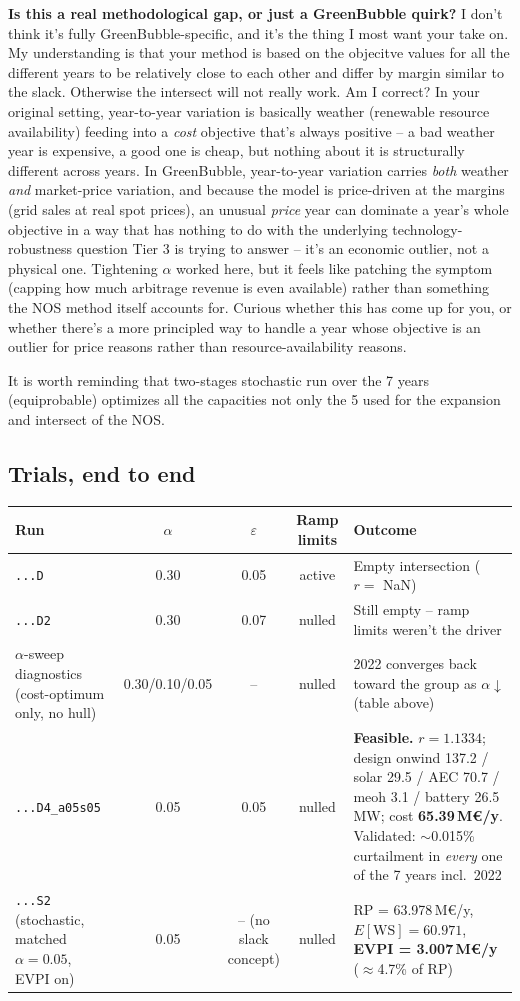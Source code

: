 \documentclass[11pt]{article}
\begin{document}
\textbf{Is this a real methodological gap, or just a GreenBubble
quirk?} I don't think it's fully GreenBubble-specific, and it's the thing
I most want your take on. My understanding is that your method is based on
the objecitve values for all the different years to be relatively close to
each other and differ by margin similar to the slack. Otherwise the intersect
will not really work. Am I correct? In your original setting, year-to-year
variation is basically weather (renewable resource availability) feeding into a
\emph{cost} objective that's always positive -- a bad weather year is
expensive, a good one is cheap, but nothing about it is structurally
different across years. In GreenBubble, year-to-year variation carries
\emph{both} weather \emph{and} market-price variation, and because the
model is price-driven at the margins (grid sales at real spot prices), an
unusual \emph{price} year can dominate a year's whole objective in a way
that has nothing to do with the underlying technology-robustness question
Tier 3 is trying to answer -- it's an economic outlier, not a physical one.
Tightening $\alpha$ worked here, but it feels like patching the symptom
(capping how much arbitrage revenue is even available) rather than
something the NOS method itself accounts for. Curious whether this has
come up for you, or whether there's a more principled way to handle a year
whose objective is an outlier for price reasons rather than
resource-availability reasons.

It is worth reminding that two-stages stochastic run over the 7 years (equiprobable)
optimizes all the capacities not only the 5 used for the expansion and intersect of the NOS.

\subsection{Trials, end to end}
\begin{center}
\small
\begin{tabular}{@{}p{2.9cm}cccp{6.4cm}@{}}
\toprule
\textbf{Run} & $\alpha$ & $\varepsilon$ & Ramp limits & \textbf{Outcome} \\
\midrule
\texttt{...D} & 0.30 & 0.05 & active &
Empty intersection ($r=$ NaN) \\
\texttt{...D2} & 0.30 & 0.07 & nulled &
Still empty -- ramp limits weren't the driver \\
$\alpha$-sweep diagnostics (cost-optimum only, no hull) & 0.30/0.10/0.05 & -- & nulled &
2022 converges back toward the group as $\alpha\downarrow$ (table above) \\
\texttt{...D4\_a05s05} & 0.05 & 0.05 & nulled &
\textbf{Feasible.} $r=1.1334$; design onwind 137.2 / solar 29.5 / AEC 70.7
/ meoh 3.1 / battery 26.5\,MW; cost \textbf{65.39\,M€/y}. Validated:
$\sim$0.015\% curtailment in \emph{every} one of the 7 years incl.\ 2022 \\
\texttt{...S2} (stochastic, matched $\alpha=0.05$, EVPI on) & 0.05 & --
(no slack concept) & nulled &
RP = 63.978\,M€/y, $E[\mathrm{WS}]=60.971$, \textbf{EVPI = 3.007\,M€/y}
($\approx$4.7\% of RP) \\
\bottomrule
\end{tabular}
\end{center}
\end{document}

